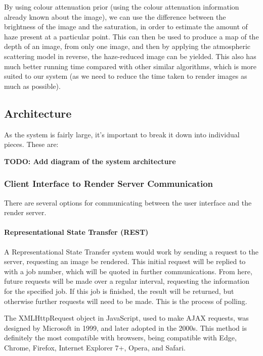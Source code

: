 \documentclass[12pt,a4paper]{article}
\begin{document}
By using colour attenuation prior (using the colour attenuation information already known about the image), we can use the difference between
the brightness of the image and the saturation, in order to estimate the amount of haze present at a particular point. This can then be used to
produce a map of the depth of an image, from only one image, and then by applying the atmospheric scattering model in reverse, the haze-reduced image
can be yielded. This also has much better running time compared with other similar algorithms, which is more suited to our system (as we need to reduce the
time taken to render images as much as possible). \cite{ColourAttenuationPriorAlg}

\subsection{Architecture}
As the system is fairly large, it's important to break it down into individual pieces. These are:

\textbf{TODO: Add diagram of the system architecture}
  \subsubsection{Client Interface to Render Server Communication}
There are several options for communicating between the user interface and the render server.

\paragraph{Representational State Transfer (REST)}
A Representational State Transfer system would work by sending a request to the server,
requesting an image be rendered. This initial request will be replied to with a job number,
which will be quoted in further communications. From here, future requests will be made
over a regular interval, requesting the information for the specified job. If this job is finished,
the result will be returned, but otherwise further requests will need to be made. This is the process
of polling.

The XMLHttpRequest object in JavaScript, used to make AJAX requests, was designed by Microsoft
in 1999, and later adopted in the 2000s.
This method is definitely the most compatible with browsers, being compatible with Edge, Chrome,
Firefox, Internet Explorer 7+, Opera, and Safari. \cite{XMLHttpRequestMozilla}
\end{document}
